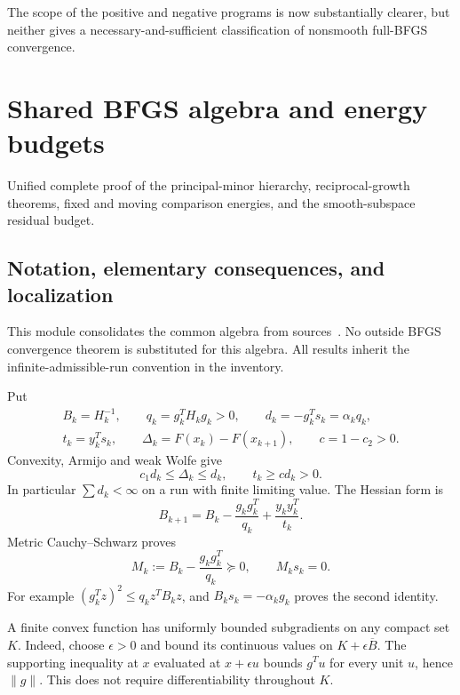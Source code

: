 \documentclass[10pt,oneside,openany]{book}
\newcommand{\ModuleTag}{I}
\theoremstyle{remark}\newtheorem{remark}{Remark}[chapter]
\newcommand{\StartModule}[3]{\cleardoublepage\renewcommand{\ModuleTag}{#1}\chapter{#2}\label{#1:chapter}\begin{small}\color{Accent}#3\end{small}\par\vspace{3pt}{\color{RuleGray}\hrule}\vspace{9pt}}
\begin{document}
The scope of the positive and negative programs is now substantially clearer, but neither gives a necessary-and-sufficient classification of nonsmooth full-BFGS convergence.


\StartModule{M}{Shared BFGS algebra and energy budgets}{Unified complete proof of the principal-minor hierarchy, reciprocal-growth theorems, fixed and moving comparison energies, and the smooth-subspace residual budget.}

\section{Notation, elementary consequences, and localization}
\label{M:notation}
This module consolidates the common algebra from sources~\cite{SM,SH,SQ,SU}. No outside BFGS convergence theorem is substituted for this algebra. All results inherit the infinite-admissible-run convention in the inventory.

Put
\[
 \begin{gathered}
 B_k=H_k^{-1},\qquad q_k=g_k^TH_kg_k>0,\qquad d_k=-g_k^Ts_k=\alpha_kq_k,\\
 t_k=y_k^Ts_k,\qquad\Delta_k=F(x_k)-F(x_{k+1}),\qquad c=1-c_2>0.
 \end{gathered}
\]
Convexity, Armijo and weak Wolfe give
\begin{equation}\label{M:basic}
 c_1d_k\le\Delta_k\le d_k,\qquad t_k\ge c d_k>0.
\end{equation}
In particular $\sum d_k<\infty$ on a run with finite limiting value. The Hessian form is
\begin{equation}\label{M:hessian}
 B_{k+1}=B_k-\frac{g_kg_k^T}{q_k}+\frac{y_ky_k^T}{t_k}.
\end{equation}
Metric Cauchy--Schwarz proves
\begin{equation}\label{M:annihilation}
 M_k:=B_k-\frac{g_kg_k^T}{q_k}\succeq0,\qquad M_ks_k=0.
\end{equation}
For example $(g_k^Tz)^2\le q_k z^TB_kz$, and $B_ks_k=-\alpha_kg_k$ proves the second identity.

A finite convex function has uniformly bounded subgradients on any compact set $K$. Indeed, choose $\epsilon>0$ and bound its continuous values on $K+\epsilon\overline B$. The supporting inequality at $x$ evaluated at $x+\epsilon u$ bounds $g^Tu$ for every unit $u$, hence $\|g\|$. This does not require differentiability throughout $K$.
\end{document}
